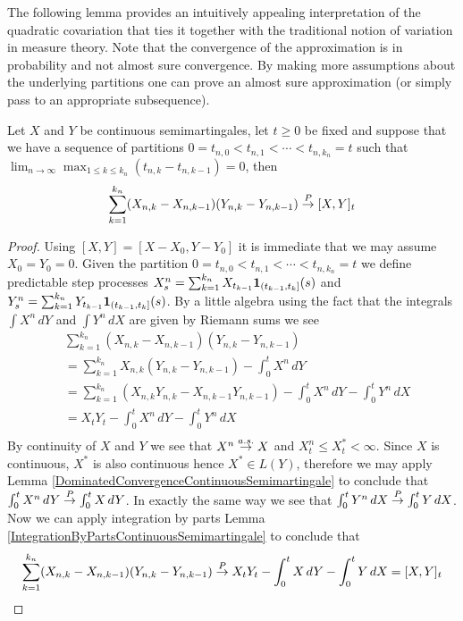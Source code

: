 The following lemma provides an intuitively appealing interpretation of the quadratic covariation that ties it together with the traditional notion of variation in measure theory.  Note that the convergence of the approximation is in probability and not almost sure convergence.  By making more assumptions about the underlying partitions one can prove an almost sure approximation (or simply pass to an appropriate subsequence).
\begin{lem}\label{ApproximateOptionalQuadraticCovariationContinuousSemimartingale}Let $X$ and $Y$ be continuous semimartingales, let $t \geq 0$ be fixed and suppose that we have a sequence of partitions $0=t_{n,0} < t_{n,1} < \dotsb < t_{n, k_n}=t$ such that $\lim_{n \to \infty} \max_{1 \leq k \leq k_n} (t_{n,k} - t_{n, k-1}) = 0$, then 
\begin{align*}
\sum_{k=1}^{k_n} (X_{n,k} - X_{n,k-1}) (Y_{n,k} - Y_{n,k-1}) \overset{P}\to [X,Y]_t
\end{align*}
\end{lem}
\begin{proof}
Using $[X,Y] = [X-X_0, Y-Y_0]$ it is immediate that we may assume $X_0 = Y_0 = 0$.  Given the partition $0=t_{n,0} < t_{n,1} < \dotsb < t_{n, k_n}=t$ we define predictable step processes $X^n_s = \sum_{k=1}^{k_n} X_{t_{k-1}} \textbf{1}_{(t_{k-1}, t_k]}(s)$ and $Y^n_s = \sum_{k=1}^{k_n} Y_{t_{k-1}} \textbf{1}_{(t_{k-1}, t_k]}(s)$.  By a little algebra using the fact that the integrals $\int X^n \, dY$ and $\int Y^n \, dX$ are given by Riemann sums we see
\begin{align*}
&\sum_{k=1}^{k_n} (X_{n,k} - X_{n,k-1}) (Y_{n,k} - Y_{n,k-1}) \\
&= \sum_{k=1}^{k_n} X_{n,k} (Y_{n,k} - Y_{n,k-1})  - \int_0^t X^n \, dY \\
&= \sum_{k=1}^{k_n}( X_{n,k} Y_{n,k} - X_{n,k-1} Y_{n,k-1})  - \int_0^t X^n \, dY - \int_0^t Y^n \, dX \\
&= X_t Y_t - \int_0^t X^n \, dY - \int_0^t Y^n \, dX \\
\end{align*}
By continuity of $X$ and $Y$ we see that $X^n \overset{a.s.}\to X$ and $X^n_t\leq X^*_t< \infty$.  Since $X$ is continuous, $X^*$ is also continuous hence $X^* \in L(Y)$, therefore we may apply Lemma \ref{DominatedConvergenceContinuousSemimartingale} to conclude that $\int_0^t X^n \, dY \overset{P}\to \int_0^t X \, dY$.  In exactly the same way we see that $\int_0^t Y^n \, dX \overset{P}\to \int_0^t Y \, dX$.  Now we can apply integration by parts Lemma \ref{IntegrationByPartsContinuousSemimartingale} to conclude that 
\begin{align*}
\sum_{k=1}^{k_n} (X_{n,k} - X_{n,k-1}) (Y_{n,k} - Y_{n,k-1})  \overset{P}\to X_t Y_t - \int_0^t X \, dY - \int_0^t Y \, dX = [X,Y]_t
\end{align*}
\end{proof}

